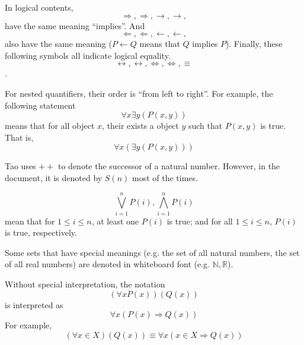 In logical contents, 
\[
\Longrightarrow, \Rightarrow, \longrightarrow, \rightarrow, 
\]
have the same meaning ``implies''. And 
\[
\Longleftarrow, \Leftarrow, \longleftarrow, \leftarrow,
\]
also have the same meaning ($P \leftarrow Q$ means that $Q$ implies $P$).
Finally, these following symbols all indicate logical equality.
\[
\leftrightarrow, \longleftrightarrow, \Leftrightarrow, \Longleftrightarrow, \equiv
\].

For nested quantifiers, their order is ``from left to right''. For example, the following statement 
\[
\forall x \exists y (P(x,y))
\]
means that for all object $x$, their exists a object $y$ such that $P(x,y)$ is true.
That is,
\[
\forall x(\exists y(P(x,y)))
\]

Tao uses $++$ to denote the successor of a natural number. However, in the document, it is denoted by 
$S(n)$ most of the times.

\[
\bigvee_{i=1}^{n} P(i), \bigwedge_{i=1}^{n} P(i)
\]
mean that for $1\leq i \leq n$, at least one $P(i)$ is true; and for all $1\leq i \leq n$, $P(i)$ is 
true, respectively.

Some sets that have special meanings (e.g. the set of all natural numbers, the set of all real numbers) 
are denoted in whiteboard font (e.g. $\mathbb{N}, \mathbb{R}$).

Without special interpretation, the notation
\[
(\forall x P(x))(Q(x))
\]
is interpreted as 
\[
\forall x(P(x) \Longrightarrow Q(x))
\]
For example, 
\[
(\forall x \in X)(Q(x)) \equiv \forall x(x \in X \Longrightarrow Q(x))
\]
